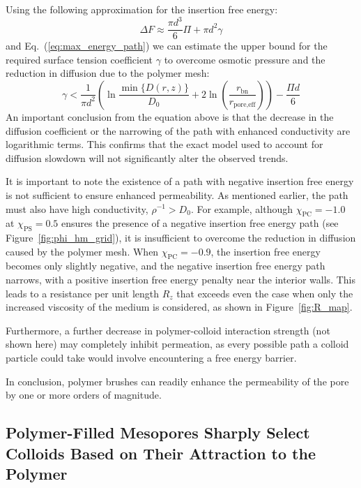 \documentclass[12pt, a4paper]{article}
\begin{document}
Using the following approximation for the insertion free energy:
\begin{equation}
    \label{eq:fe_approx}
    \Delta F \approx \frac{\pi d^3}{6} \Pi + \pi d^2 \gamma
\end{equation}
and Eq.~({\ref{eq:max_energy_path}}) we can estimate the upper bound for the required surface tension coefficient $\gamma$ to overcome osmotic pressure and the reduction in diffusion due to the polymer mesh:
\begin{equation}
    \label{eq:gamma_crit}
    \gamma < \frac{1}{\pi d^2} \left( \ln\frac{\min\{D(r,z)\}}{D_0} + 2\ln\left( \frac{r_{\text{bn}}}{r_{\text{pore,eff}}} \right) \right) - \frac{\Pi d}{6}
\end{equation}
An important conclusion from the equation above is that the decrease in the diffusion coefficient or the narrowing of the path with enhanced conductivity are logarithmic terms.
This confirms that the exact model used to account for diffusion slowdown will not significantly alter the observed trends.


It is important to note the existence of a path with negative insertion free energy is not sufficient to ensure enhanced permeability.
As mentioned earlier, the path must also have high conductivity, $\rho^{-1} > D_0$.
For example, although $\chi_{\text{PC}} = -1.0$ at $\chi_{\text{PS}} = 0.5$ ensures the presence of a negative insertion free energy path (see Figure~\ref{fig:phi_hm_grid}), it is insufficient to overcome the reduction in diffusion caused by the polymer mesh.
When $\chi_{\textrm{PC}} = -0.9$, the insertion free energy becomes only slightly negative, and the negative insertion free energy path narrows, with a positive insertion free energy penalty near the interior walls. 
This leads to a resistance per unit length $R_z$ that exceeds even the case when only the increased viscosity of the medium is considered, as shown in Figure~\ref{fig:R_map}.

Furthermore, a further decrease in polymer-colloid interaction strength (not shown here) may completely inhibit permeation, as every possible path a colloid particle could take would involve encountering a free energy barrier.

In conclusion, polymer brushes can readily enhance the permeability of the pore by one or more orders of magnitude.

\subsection{Polymer-Filled Mesopores Sharply Select Colloids Based on Their Attraction to the Polymer}
\end{document}
